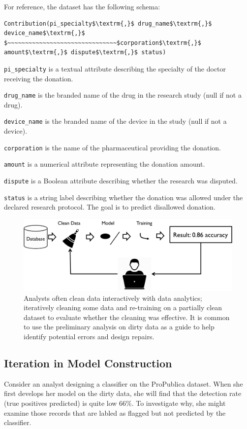 For reference, the dataset has the following schema:
\begin{lstlisting}[mathescape,basicstyle={\small}]
Contribution(pi_specialty$\textrm{,}$ drug_name$\textrm{,}$ device_name$\textrm{,}$
$~~~~~~~~~~~~~~~~~~~~~~~~~~~~~~~$corporation$\textrm{,}$ amount$\textrm{,}$ dispute$\textrm{,}$ status)
\end{lstlisting}

\noindent\texttt{pi\_specialty} is a textual attribute describing the specialty of the doctor receiving the donation.

\noindent\texttt{drug\_name} is the branded name of the drug in the research study (null if not a drug).

\noindent\texttt{device\_name} is the branded name of the device in the study (null if not a device).

\noindent\texttt{corporation} is the name of the pharmaceutical providing the donation.

\noindent\texttt{amount} is a numerical attribute representing the donation amount.

\noindent\texttt{dispute} is a Boolean attribute describing whether the research was disputed.

\noindent\texttt{status} is a string label describing whether the  donation was allowed under the declared research protocol. The goal is to predict disallowed  donation. 


\begin{figure}[t]
\centering
 \includegraphics[width=\columnwidth]{figs/workflow.png}
 \caption{Analysts often clean data interactively with data analytics; iteratively cleaning some data and re-training on a partially clean dataset to evaluate whether the cleaning was effective. It is common to use the preliminary analysis on dirty data as a guide to help identify potential errors and design repairs. \label{cartoon}}
\vspace{-2em}
\end{figure}

\subsection{Iteration in Model Construction}
Consider an analyst designing a classifier on the ProPublica dataset.
When she first develops her model on the dirty data, she will find that the detection rate (true positives predicted) is quite low 66\%.
To investigate why, she might examine those records that are labled as flagged but not predicted by the classifier.

